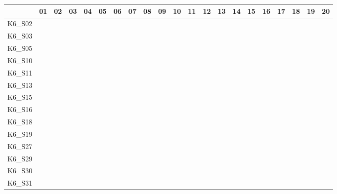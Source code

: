 \begin{table}[htpb]
    \setlength{\tabcolsep}{0.2em}
    \tiny
    \centering
    \begin{tabular}{l|rrrrrrrrrrrrrrrrrrrr}
        \toprule
               & 01 & 02 & 03 & 04 & 05 & 06 & 07 & 08 & 09 & 10 & 11 & 12 & 13 & 14 & 15 & 16 & 17 & 18 & 19 & 20 \\
        \midrule
        K6\_S02 & \y & \y & \y & \y & \y & \y & \y & \y & \y & \y & \y & \y & \y & \y & \y & \x & \x & \y & \y & \y \\
        K6\_S03 & \y & \y & \y & \y & \y & \y & \y & \y & \y & \y & \y & \y & \y & \y & \x & \y & \y & \y & \y & \y \\
        K6\_S05 & \y & \y & \y & \y & \y & \y & \y & \y & \y & \y & \y & \x & \y & \y & \y & \y & \y & \y & \y & \y \\
        K6\_S10 & \y & \y & \y & \y & \y & \y & \y & \y & \y & \y & \y & \y & \y & \y & \y & \x & \y & \y & \x & \x \\
        K6\_S11 & \y & \y & \y & \y & \y & \y & \y & \y & \y & \y & \y & \y & \y & \y & \y & \y & \y & \y & \y & \y \\
        K6\_S13 & \y & \y & \y & \y & \y & \y & \y & \y & \y & \y & \y & \y & \y & \y & \y & \y & \y & \y & \y & \y \\
        K6\_S15 & \y & \y & \y & \y & \y & \y & \y & \y & \y & \y & \y & \y & \y & \y & \y & \y & \y & \y & \y & \y \\
        K6\_S16 & \y & \y & \y & \y & \y & \y & \y & \y & \y & \y & \y & \y & \y & \y & \y & \y & \y & \y & \y & \y \\
        K6\_S18 & \y & \y & \y & \y & \y & \y & \y & \y & \y & \y & \y & \y & \y & \y & \y & \y & \y & \y & \y & \y \\
        K6\_S19 & \y & \y & \y & \y & \y & \y & \y & \y & \y & \y & \y & \y & \y & \y & \y & \y & \y & \y & \x & \y \\
        K6\_S27 & \y & \y & \y & \y & \y & \y & \y & \y & \y & \y & \y & \y & \y & \y & \y & \y & \y & \y & \y & \y \\
        K6\_S29 & \y & \y & \y & \y & \y & \y & \y & \y & \y & \y & \y & \y & \y & \y & \y & \y & \y & \y & \y & \y \\
        K6\_S30 & \y & \y & \y & \y & \y & \y & \y & \y & \y & \y & \y & \y & \x & \x & \y & \y & \y & \y & \y & \y \\
        K6\_S31 & \y & \y & \y & \y & \y & \y & \y & \y & \y & \y & \y & \y & \y & \y & \y & \y & \y & \y & \y & \y \\

\end{tabular}
\end{table}
